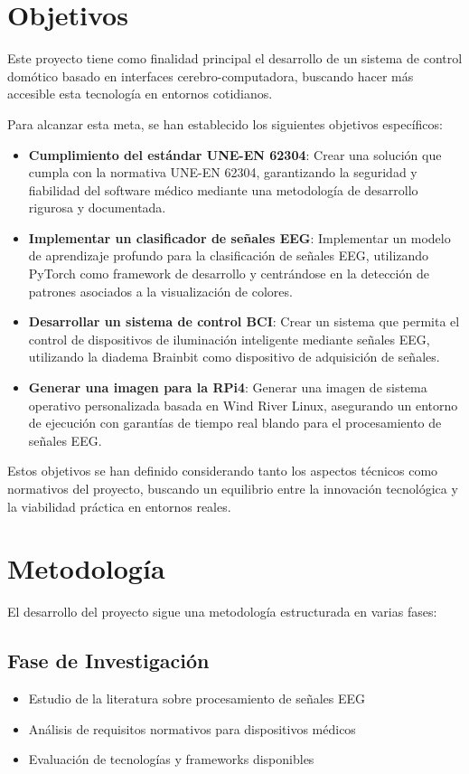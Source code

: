 \section{Objetivos}
Este proyecto tiene como finalidad principal el desarrollo de un sistema de control domótico basado en interfaces cerebro-computadora, buscando hacer más accesible esta tecnología en entornos cotidianos. 

Para alcanzar esta meta, se han establecido los siguientes objetivos específicos:

\begin{itemize}
    \item \textbf{Cumplimiento del estándar UNE-EN 62304}: Crear una solución que cumpla con la normativa UNE-EN 62304, garantizando la seguridad y fiabilidad del software médico mediante una metodología de desarrollo rigurosa y documentada.
    
    \item \textbf{Implementar un clasificador de señales EEG}: Implementar un modelo de aprendizaje profundo para la clasificación de señales EEG, utilizando PyTorch como framework de desarrollo y centrándose en la detección de patrones asociados a la visualización de colores.
    
    \item \textbf{Desarrollar un sistema de control BCI}: Crear un sistema que permita el control de dispositivos de iluminación inteligente mediante señales EEG, utilizando la diadema Brainbit como dispositivo de adquisición de señales.
    
    \item \textbf{Generar una imagen para la RPi4}: Generar una imagen de sistema operativo personalizada basada en Wind River Linux, asegurando un entorno de ejecución con garantías de tiempo real blando para el procesamiento de señales EEG.
\end{itemize}

Estos objetivos se han definido considerando tanto los aspectos técnicos como normativos del proyecto, buscando un equilibrio entre la innovación tecnológica y la viabilidad práctica en entornos reales.

\newpage
\section{Metodología}
El desarrollo del proyecto sigue una metodología estructurada en varias fases:

\subsection{Fase de Investigación}
\begin{itemize}
    \item Estudio de la literatura sobre procesamiento de señales EEG
    \item Análisis de requisitos normativos para dispositivos médicos
    \item Evaluación de tecnologías y frameworks disponibles
\end{itemize}

